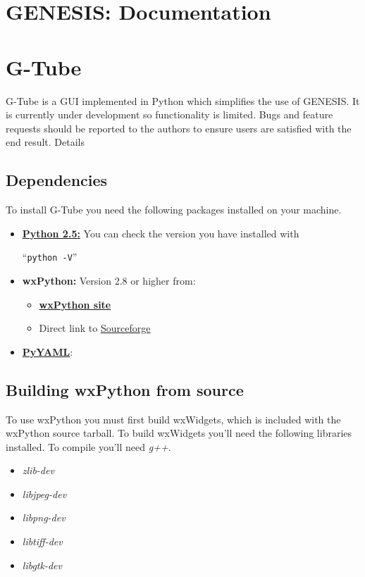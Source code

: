 \documentclass[12pt]{article}
\begin{document}
\section*{GENESIS: Documentation}

\section*{G-Tube}

G-Tube is a GUI implemented in Python which simplifies the use of GENESIS. It is currently under development so functionality is limited. Bugs and feature requests should be reported to the authors to ensure users are satisfied with the end result.
Details

\subsection*{Dependencies}

To install G-Tube you need the following packages installed on your machine.

\begin{itemize}
   \item {\href{http://python.org/download/}{\bf Python 2.5:}} You can check the version you have installed with
   
   ``{\tt python -V}''
   
   \item {\bf wxPython:} Version 2.8 or higher from:   
   \begin{itemize}
      \item \href{http://www.wxpython.org/download.php}{\bf wxPython site}
      \item Direct link to \href{https://sourceforge.net/projects/wxpython/files/}{Sourceforge}
   \end{itemize}
   \item \href{http://pyyaml.org/ }{\bf PyYAML}:
\end{itemize}

\subsection*{Building wxPython from source}

To use wxPython you must first build wxWidgets, which is included with the wxPython source tarball. To build wxWidgets you'll need the following libraries installed. To compile you'll need {\it g++}.

\begin{itemize}
   \item {\it zlib-dev}
   \item {\it libjpeg-dev}
   \item {\it libpng-dev}
   \item {\it libtiff-dev}
   \item {\it libgtk-dev}
\end{itemize}
\end{document}
